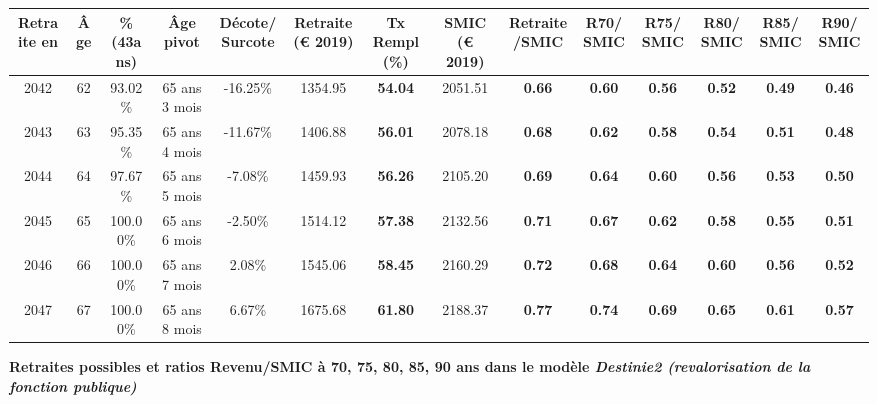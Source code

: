\begin{adjustbox}{max width=\textwidth} 
\begin{tabular}[htb]{|c|c||c|c|c||c|c||c|c||c|c|c|c|c|} 
\hline 
 Retraite en &  Âge &  \%(43ans) &  Âge pivot &  Décote/Surcote &  Retraite (\euro{} 2019) &  Tx Rempl(\%) &  SMIC (\euro{} 2019) &  Retraite/SMIC &  R70/SMIC &  R75/SMIC &  R80/SMIC &  R85/SMIC &  R90/SMIC \\ 
\hline \hline 
 2042 &  62 &  93.02\% &  65 ans 3 mois &  -16.25\% &  1354.95 &  {\bf 54.04} &  2051.51 &  {\bf {\color{red} 0.66}} &  {\bf {\color{red} 0.60}} &  {\bf {\color{red} 0.56}} &  {\bf {\color{red} 0.52}} &  {\bf {\color{red} 0.49}} &  {\bf {\color{red} 0.46}} \\ 
\hline 
 2043 &  63 &  95.35\% &  65 ans 4 mois &  -11.67\% &  1406.88 &  {\bf 56.01} &  2078.18 &  {\bf {\color{red} 0.68}} &  {\bf {\color{red} 0.62}} &  {\bf {\color{red} 0.58}} &  {\bf {\color{red} 0.54}} &  {\bf {\color{red} 0.51}} &  {\bf {\color{red} 0.48}} \\ 
\hline 
 2044 &  64 &  97.67\% &  65 ans 5 mois &  -7.08\% &  1459.93 &  {\bf 56.26} &  2105.20 &  {\bf {\color{red} 0.69}} &  {\bf {\color{red} 0.64}} &  {\bf {\color{red} 0.60}} &  {\bf {\color{red} 0.56}} &  {\bf {\color{red} 0.53}} &  {\bf {\color{red} 0.50}} \\ 
\hline 
 2045 &  65 &  100.00\% &  65 ans 6 mois &  -2.50\% &  1514.12 &  {\bf 57.38} &  2132.56 &  {\bf {\color{red} 0.71}} &  {\bf {\color{red} 0.67}} &  {\bf {\color{red} 0.62}} &  {\bf {\color{red} 0.58}} &  {\bf {\color{red} 0.55}} &  {\bf {\color{red} 0.51}} \\ 
\hline 
 2046 &  66 &  100.00\% &  65 ans 7 mois &  2.08\% &  1545.06 &  {\bf 58.45} &  2160.29 &  {\bf {\color{red} 0.72}} &  {\bf {\color{red} 0.68}} &  {\bf {\color{red} 0.64}} &  {\bf {\color{red} 0.60}} &  {\bf {\color{red} 0.56}} &  {\bf {\color{red} 0.52}} \\ 
\hline 
 2047 &  67 &  100.00\% &  65 ans 8 mois &  6.67\% &  1675.68 &  {\bf 61.80} &  2188.37 &  {\bf {\color{red} 0.77}} &  {\bf {\color{red} 0.74}} &  {\bf {\color{red} 0.69}} &  {\bf {\color{red} 0.65}} &  {\bf {\color{red} 0.61}} &  {\bf {\color{red} 0.57}} \\ 
\hline 
\hline 
\end{tabular} 
\end{adjustbox} 
 
 \vspace{0.1cm} 
{\bf \noindent Retraites possibles et ratios Revenu/SMIC à 70, 75, 80, 85, 90 ans dans le modèle \emph{Destinie2 (revalorisation de la fonction publique)}}  
 
